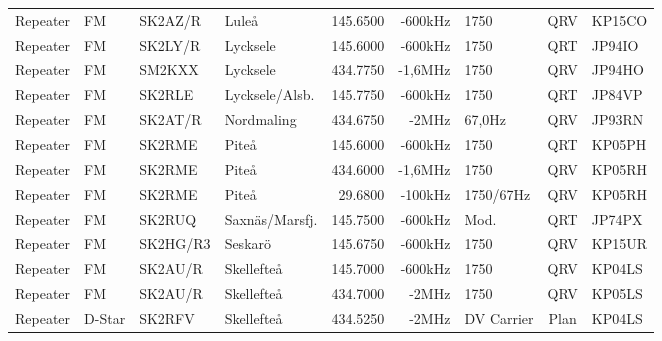 \begin{landscape}
\begin{longtable}{llllrrlcl}
	Repeater          & FM           & SK2AZ/R       & Luleå              &          145.6500 &        -600kHz & 1750             &       QRV       & KP15CO           \\
	Repeater          & FM           & SK2LY/R       & Lycksele           &          145.6000 &        -600kHz & 1750             &       QRT       & JP94IO           \\
	Repeater          & FM           & SM2KXX        & Lycksele           &          434.7750 &        -1,6MHz & 1750             &       QRV       & JP94HO           \\
	Repeater          & FM           & SK2RLE        & Lycksele/Alsb.     &          145.7750 &        -600kHz & 1750             &       QRT       & JP84VP           \\
	Repeater          & FM           & SK2AT/R       & Nordmaling         &          434.6750 &          -2MHz & 67,0Hz           &       QRV       & JP93RN           \\
	Repeater          & FM           & SK2RME        & Piteå              &          145.6000 &        -600kHz & 1750             &       QRT       & KP05PH           \\
	Repeater          & FM           & SK2RME        & Piteå              &          434.6000 &        -1,6MHz & 1750             &       QRV       & KP05RH           \\
	Repeater          & FM           & SK2RME        & Piteå              &           29.6800 &        -100kHz & 1750/67Hz        &       QRV       & KP05RH           \\
	Repeater          & FM           & SK2RUQ        & Saxnäs/Marsfj.     &          145.7500 &        -600kHz & Mod.             &       QRT       & JP74PX           \\
	Repeater          & FM           & SK2HG/R3      & Seskarö            &          145.6750 &        -600kHz & 1750             &       QRV       & KP15UR           \\
	Repeater          & FM           & SK2AU/R       & Skellefteå         &          145.7000 &        -600kHz & 1750             &       QRV       & KP04LS           \\
	Repeater          & FM           & SK2AU/R       & Skellefteå         &          434.7000 &          -2MHz & 1750             &       QRV       & KP05LS           \\
	Repeater          & D-Star       & SK2RFV        & Skellefteå         &          434.5250 &          -2MHz & DV Carrier       &      Plan       & KP04LS           \\

\end{longtable}
\end{landscape}
